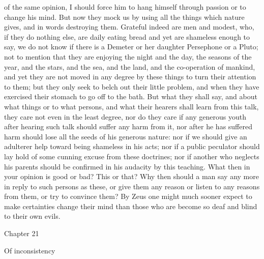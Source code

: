 \documentclass[a4paper]{article}
\begin{document}
of the same opinion, I should force him to hang himself through passion or to
change his mind. But now they mock us by using all the things which nature
gives, and in words destroying them.
    Grateful indeed are men and modest, who, if they do nothing else, are daily
eating bread and yet are shameless enough to say, we do not know if there is a
Demeter or her daughter Persephone or a Pluto; not to mention that they are
enjoying the night and the day, the seasons of the year, and the stars, and the
sea, and the land, and the co-operation of mankind, and yet they are not moved
in any degree by these things to turn their attention to them; but they only
seek to belch out their little problem, and when they have exercised their
stomach to go off to the bath. But what they shall say, and about what things
or to what persons, and what their hearers shall learn from this talk, they
care not even in the least degree, nor do they care if any generous youth after
hearing such talk should suffer any harm from it, nor after he has suffered
harm should lose all the seeds of his generous nature: nor if we should give an
adulterer help toward being shameless in his acts; nor if a public peculator
should lay hold of some cunning excuse from these doctrines; nor if another who
neglects his parents should be confirmed in his audacity by this teaching. What
then in your opinion is good or bad? This or that? Why then should a man say
any more in reply to such persons as these, or give them any reason or listen
to any reasons from them, or try to convince them? By Zeus one might much
sooner expect to make certainties change their mind than those who are become
so deaf and blind to their own evils.

Chapter 21

Of inconsistency
\end{document}
